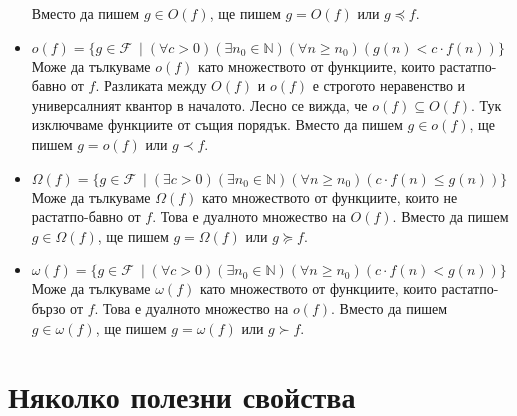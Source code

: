 \documentclass{article}
\newcommand{\N}{\mathbb{N}}
\newcommand{\F}{\mathcal{F}}
\theoremstyle{definition}
\theoremstyle{plain}
\theoremstyle{remark}
\theoremstyle{definition}
\begin{document}
\begin{itemize}
        Вместо да пишем $g \in O(f)$, ще пишем $g = O(f)$ или $g \preceq f$.
  \item $o(f) = \{ g \in \F \: \mid (\forall c > 0)(\exists n_0 \in \N)(\forall n \geq n_0)(g(n) < c \cdot f(n))\}$ \\
        Може да тълкуваме $o(f)$ като множеството от функциите, които растат\footnotemark[1] по-бавно от $f$.
        Разликата между $O(f)$ и $o(f)$ е строгото неравенство и универсалният квантор в началото.
        Лесно се вижда, че $o(f) \subseteq O(f)$.
        Тук изключваме функциите от същия порядък.
        Вместо да пишем $g \in o(f)$, ще пишем $g = o(f)$ или $g \prec f$.
  \item $\Omega(f) = \{ g \in \F \: \mid (\exists c > 0)(\exists n_0 \in \N)(\forall n \geq n_0)(c \cdot f(n) \leq g(n))\}$ \\
        Може да тълкуваме $\Omega(f)$ като множеството от функциите, които не растат\footnotemark[1] по-бавно от $f$.
        Това е дуалното множество на $O(f)$.
        Вместо да пишем $g \in \Omega(f)$, ще пишем $g = \Omega(f)$ или $g \succeq f$.
  \item $\omega(f) = \{ g \in \F \: \mid (\forall c > 0)(\exists n_0 \in \N)(\forall n \geq n_0)(c \cdot f(n) < g(n))\}$ \\
        Може да тълкуваме $\omega(f)$ като множеството от функциите, които растат\footnotemark[1] по-бързо от $f$.
        Това е дуалното множество на $o(f)$.
        Вместо да пишем $g \in \omega(f)$, ще пишем $g = \omega(f)$ или $g \succ f$.
\end{itemize}

\section*{Няколко полезни свойства}
\end{document}
